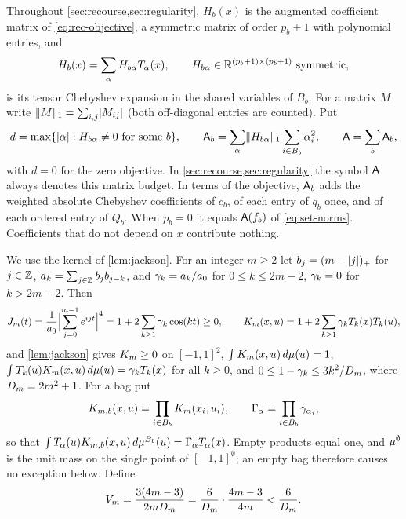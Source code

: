 Throughout \cref{sec:recourse,sec:regularity}, $H_b(x)$ is the augmented
coefficient matrix of \eqref{eq:rec-objective}, a symmetric matrix of order
$p_b+1$ with polynomial entries, and
\begin{equation}\label{eq:rec-H-expansion}
  H_b(x)=\sum_{\alpha}H_{b\alpha}T_\alpha(x),\qquad
  H_{b\alpha}\in\mathbb{R}^{(p_b+1)\times(p_b+1)}\ \text{symmetric},
\end{equation}
is its tensor Chebyshev expansion in the shared variables of $B_b$. For a
matrix $M$ write $\lVert M\rVert_{1}=\sum_{i,j}\lvert M_{ij}\rvert$ (both off-diagonal
entries are counted). Put
\begin{equation}\label{eq:rec-budget}
  d=\max\{\lvert \alpha\rvert:H_{b\alpha}\ne0\text{ for some }b\},\qquad
  \mathsf{A}_b=\sum_\alpha\lVert H_{b\alpha}\rVert_{1}\sum_{i\in B_b}\alpha_i^2,\qquad
  \mathsf{A}=\sum_b\mathsf{A}_b,
\end{equation}
with $d=0$ for the zero objective. In \cref{sec:recourse,sec:regularity}
the symbol $\mathsf{A}$ always denotes this matrix budget. In terms of the
objective, $\mathsf{A}_b$ adds the weighted absolute Chebyshev coefficients of
$c_b$, of each entry of $q_b$ once, and of each ordered entry of $Q_b$.
When $p_b=0$ it equals $\mathsf{A}(f_b)$ of \eqref{eq:set-norms}. Coefficients
that do not depend on $x$ contribute nothing.

We use the kernel of \cref{lem:jackson}. For an integer $m\ge2$ let
$b_j=(m-\lvert j\rvert)_+$ for $j\in\mathbb{Z}$, $a_k=\sum_{j\in\mathbb{Z}}b_jb_{j-k}$, and
$\gamma_k=a_k/a_0$ for $0\le k\le2m-2$, $\gamma_k=0$ for $k>2m-2$. Then
\begin{equation}\label{eq:rec-circle-kernel}
  J_m(t)=\frac1{a_0}\Bigl\lvert\sum_{j=0}^{m-1}e^{ijt}\Bigr\rvert^4
  =1+2\sum_{k\ge1}\gamma_k\cos(kt)\ge0,\qquad
  K_m(x,u)=1+2\sum_{k\ge1}\gamma_kT_k(x)T_k(u),
\end{equation}
and \cref{lem:jackson} gives $K_m\ge0$ on $[-1,1]^2$,
$\int K_m(x,u)\,d\mu(u)=1$, $\int T_k(u)K_m(x,u)\,d\mu(u)=\gamma_kT_k(x)$
for all $k\ge0$, and $0\le1-\gamma_k\le3k^2/D_m$, where $D_m=2m^2+1$. For a
bag put
\[
  K_{m,b}(x,u)=\prod_{i\in B_b}K_m(x_i,u_i),\qquad
  \Gamma_\alpha=\prod_{i\in B_b}\gamma_{\alpha_i},
\]
so that $\int T_\alpha(u)K_{m,b}(x,u)\,d\mu^{B_b}(u)=\Gamma_\alpha
T_\alpha(x)$. Empty products equal one, and $\mu^{\emptyset}$ is the unit
mass on the single point of $[-1,1]^{\emptyset}$; an empty bag therefore
causes no exception below. Define
\begin{equation}\label{eq:rec-Vm}
  V_m=\frac{3(4m-3)}{2mD_m}=\frac6{D_m}\cdot\frac{4m-3}{4m}<\frac6{D_m} .
\end{equation}


